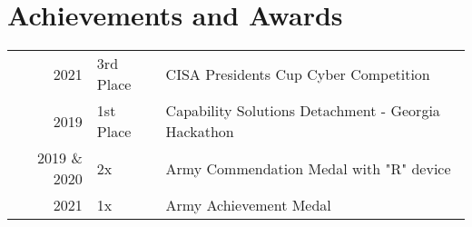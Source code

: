\documentclass[]{resume}
\begin{document}
\begin{minipage}[t]{0.69\textwidth}


\section{Achievements and Awards}
\begin{tabular}{rll}
2021         & 3rd Place  & CISA Presidents Cup Cyber Competition \\
2019         & 1st Place  & Capability Solutions Detachment - Georgia Hackathon \\
2019 \& 2020 & 2x         & Army Commendation Medal with "R" device \\
2021         & 1x         & Army Achievement Medal
\end{tabular}


\end{minipage}

%
%

\end{document}
